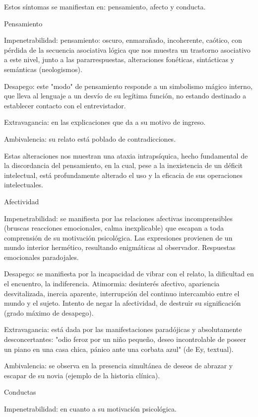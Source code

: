 Estos síntomas se manifiestan en: pensamiento, afecto y conducta.

Pensamiento

Impenetrabilidad: pensamiento: oscuro, enmarañado, incoherente, caótico, con pérdida de la secuencia asociativa lógica que nos muestra un trastorno asociativo a este nivel, junto a las pararrespuestas, alteraciones fonéticas, sintácticas y semánticas (neologismos).

Desapego: este "modo" de pensamiento responde a un simbolismo mágico interno, que lleva al lenguaje a un desvío de su legítima función, no estando destinado a establecer contacto con el entrevistador.

Extravagancia: en las explicaciones que da a su motivo de ingreso.

Ambivalencia: su relato está poblado de contradicciones.

Estas alteraciones nos muestran una ataxia intrapsíquica, hecho fundamental de la discordancia del pensamiento, en la cual, pese a la inexistencia de un déficit intelectual, está profundamente alterado el uso y la eficacia de sus operaciones intelectuales.

Afectividad

Impenetrabilidad: se manifiesta por las relaciones afectivas incomprensibles (bruscas reacciones emocionales, calma inexplicable) que escapan a toda comprensión de su motivación psicológica. Las expresiones provienen de un mundo interior hermético, resultando enigmáticas al observador. Respuestas emocionales paradojales.

Desapego: se manifiesta por la incapacidad de vibrar con el relato, la dificultad en el encuentro, la indiferencia. Atimormia: desinterés afectivo, apariencia desvitalizada, inercia aparente, interrupción del continuo intercambio entre el mundo y el sujeto. Intento de negar la afectividad, de destruir su significación (grado máximo de desapego).

Extravagancia: está dada por las manifestaciones paradójicas y absolutamente desconcertantes: "odio feroz por un niño pequeño, deseo incontrolable de poseer un piano en una casa chica, pánico ante una corbata azul" (de Ey, textual).

Ambivalencia: se observa en la presencia simultánea de deseos de abrazar y escapar de su novia (ejemplo de la historia clínica).

Conductas

Impenetrabilidad: en cuanto a su motivación psicológica.

